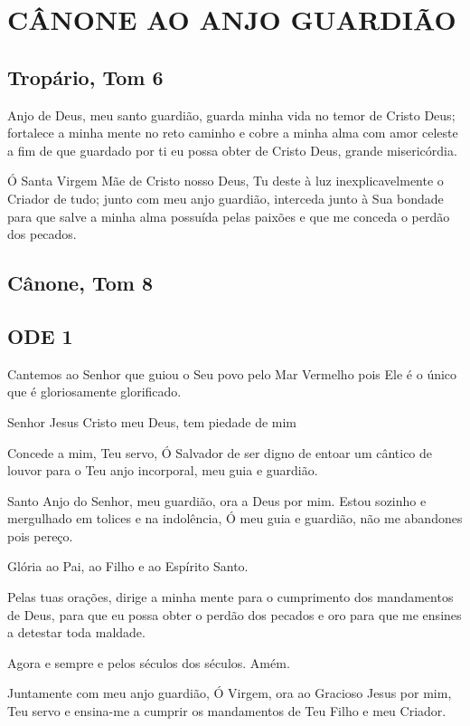 \documentclass{subfiles}
\begin{document}
\chapter{CÂNONE AO ANJO GUARDIÃO}

\section*{Tropário, Tom 6}

Anjo de Deus, meu santo guardião, guarda minha vida no temor de
Cristo Deus; fortalece a minha mente no reto caminho e cobre a minha alma
com amor celeste a fim de que guardado por ti eu possa obter de Cristo Deus,
grande misericórdia.

\theotokion{}Ó Santa Virgem Mãe de Cristo nosso Deus, Tu deste à luz
inexplicavelmente o Criador de tudo; junto com meu anjo guardião, interceda
junto à Sua bondade para que salve a minha alma possuída pelas paixões e que
me conceda o perdão dos pecados.

\section*{Cânone, Tom 8}

\section*{ODE 1}

\eirmos{}Cantemos ao Senhor que guiou o Seu povo pelo Mar Vermelho pois Ele
é o único que é gloriosamente glorificado.

Senhor Jesus Cristo meu Deus, tem piedade de mim

\textbf{}Concede a mim, Teu servo, Ó Salvador de ser
digno de entoar um cântico de louvor para o Teu anjo incorporal, meu guia e
guardião.

Santo Anjo do Senhor, meu guardião, ora a Deus por mim.
Estou sozinho e mergulhado em tolices e na indolência, Ó meu guia e
guardião, não me abandones pois pereço.

Glória ao Pai, ao Filho e ao Espírito Santo.

Pelas tuas orações, dirige a minha mente para o cumprimento dos
mandamentos de Deus, para que eu possa obter o perdão dos pecados e oro
para que me ensines a detestar toda maldade.

Agora e sempre e pelos séculos dos séculos. Amém.

Juntamente com meu anjo guardião, Ó Virgem, ora ao Gracioso Jesus
por mim, Teu servo e ensina-me a cumprir os mandamentos de Teu Filho e
meu Criador.
\end{document}
